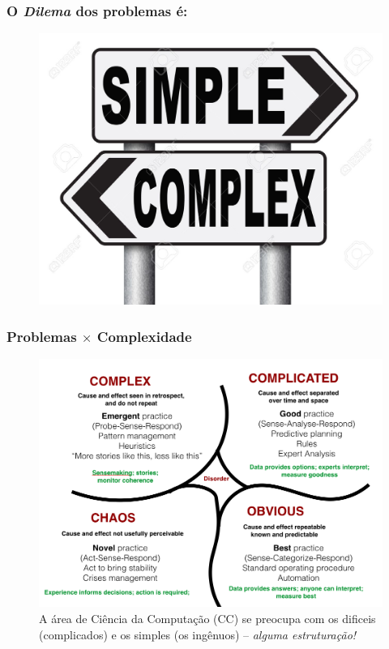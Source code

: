 \documentclass[10pt]{beamer}
\begin{document}
\begin{frame}[fragile]

\frametitle{O \emph{Dilema} dos problemas  é:}

\begin{figure}[!ht]
\centering
\includegraphics[height =.65\textheight,width=.8\textwidth]
{figuras/dilema_eh.jpg}
\end{figure}

\end{frame}







\begin{frame}[fragile]

\frametitle{Problemas $\times$ Complexidade}
\begin{figure}[!ht]
\centering
\includegraphics[height =.65\textheight,width=.8\textwidth]
{figuras/os_problemas.png}
\caption{A área de Ciência da Computação (CC) se preocupa com os  dificeis (complicados) e os simples (os ingênuos) -- \emph{alguma estruturação!}}
\end{figure}

\end{frame}
\end{document}

